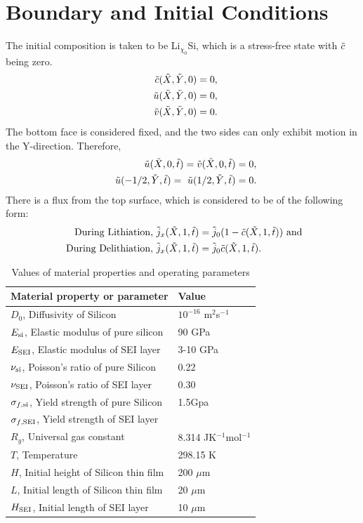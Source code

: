 \section{Boundary and Initial Conditions}
The initial composition is taken to be Li$_{\chi_{0}}$Si, which is a stress-free state with $\tilde{c}$ being zero.
\begin{align}
    \tc(\tX, \tY, 0) = 0, \\
    \tu(\tX, \tY, 0) = 0,\\
    \tv(\tX, \tY, 0) = 0.
\end{align}
The bottom face is considered fixed, and the two sides can only exhibit motion in the Y-direction. Therefore,
\begin{align}
    \tu(\tX, 0, \tt) = \tv(\tX, 0, \tt) = 0, \\
    \tu(-1/2, \tY, \tt) =  \tu(1/2, \tY, \tt) = 0.
\end{align}
There is a flux from the top surface, which is considered to be of the following form: 
\begin{align}
    \text{During Lithiation, }\td{j}_x(\tX, 1, \tt) &= \td{j}_0 (1 - \tc(\tX, 1, \tt)) \text{ and } \\
    \text{During Delithiation, }\td{j}_x(\tX, 1, \tt) &= \td{j}_0 \tc(\tX, 1, \tt).
\end{align} 

\begin{table}[H]
\caption{Values of material properties and operating parameters}
\vspace{1em}
\begin{tabularx}{\textwidth}{Xl}
\hline
 {Material property or parameter} & {Value} \\
\hline
$D_0$, Diffusivity of Silicon & $10^{-16}$ m$^{2}$s$^{-1}$ \\
$E_{{\rm{si}}}$, Elastic modulus of pure silicon & 90 GPa \\
$E_{\rm{SEI}}$, Elastic modulus of SEI layer & 3-10 GPa \\
$\nu_{{\rm{si}}}$, Poisson's ratio of pure Silicon & 0.22\\
$\nu_{\rm{SEI}}$, Poisson's ratio of SEI layer & 0.30\\
$\sigma_{f,{\rm{si}}}$, Yield strength of pure Silicon & 1.5Gpa\\
$\sigma_{f, {\rm{SEI}}}$, Yield strength of SEI layer & \\
$R_g$, Universal gas constant & 8.314 JK$^{-1}$mol$^{-1}$\\
$T$, Temperature & 298.15 K\\
$H$, Initial height of Silicon thin film & 200 $\mu$m\\
$L$, Initial length of Silicon thin film & 20 $\mu$m\\
$H_{\rm{SEI}}$, Initial length of SEI layer & 10 $\mu$m
\end{tabularx}
\end{table}
